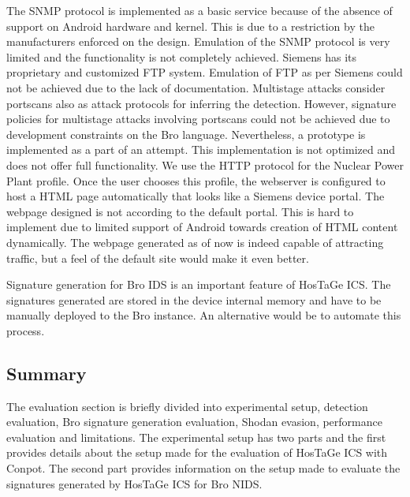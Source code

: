 \documentclass[article,msc=informatik,type=msc,colorback,accentcolor=tud9c]{tudthesis}
\begin{document}
	
	\vspace{3mm}
	 The SNMP protocol is implemented as a basic service because of the absence of support on Android hardware and kernel. This is due to a restriction by the manufacturers enforced on the design. Emulation of the SNMP protocol is very limited and the functionality is not completely achieved. Siemens has its proprietary and customized FTP system. Emulation of FTP as per Siemens could not be achieved due to the lack of documentation. Multistage attacks consider portscans also as attack protocols for inferring the detection. However, signature policies for multistage attacks involving portscans could not be achieved due to development constraints on the Bro language. Nevertheless, a prototype is implemented as a part of an attempt. This implementation is not optimized and does not offer full functionality. We use the HTTP protocol for the Nuclear Power Plant profile. Once the user chooses this profile, the webserver is configured to host a HTML page automatically that looks like a Siemens device portal. The webpage designed is not according to the default portal. This is hard to implement due to limited support of Android towards creation of HTML content dynamically. The webpage generated as of now is indeed capable of attracting traffic, but a feel of the default site would make it even better.
	
	
	 \vspace{3mm}
	 
	  Signature generation for Bro IDS is an important feature of HosTaGe ICS. The signatures generated are stored in the device internal memory and have to be manually deployed to the Bro instance. An alternative would be to automate this process.
	
	
	
	
	\subsection{Summary}
	The evaluation section is briefly divided into experimental setup, detection evaluation, Bro signature generation evaluation, Shodan evasion, performance evaluation and limitations. The experimental setup has two parts and the first provides details about the setup made for the evaluation of HosTaGe ICS with Conpot. The second part provides information on the setup made to evaluate the signatures generated by HosTaGe ICS for Bro \ac{NIDS}.
	
\end{document}
